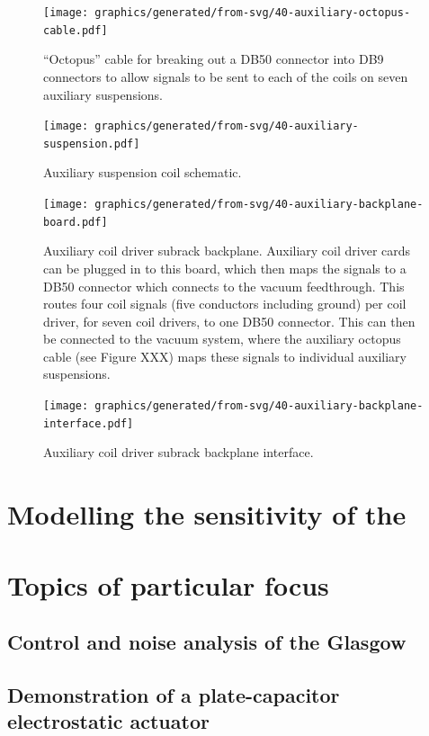 \begin{figure}
  \centering
  \texttt{[image: graphics/generated/from-svg/40-auxiliary-octopus-cable.pdf]}
  \caption[Auxiliary octopus cable schematic]{\label{fig:aux-octopus-cable-wiring}``Octopus'' cable for breaking out a DB50 connector into DB9 connectors to allow signals to be sent to each of the coils on seven auxiliary suspensions.}
\end{figure}

\begin{figure}
  \centering
  \texttt{[image: graphics/generated/from-svg/40-auxiliary-suspension.pdf]}
  \caption[Auxiliary suspension coil schematic]{\label{fig:aux-suspension-wiring}Auxiliary suspension coil schematic.}
\end{figure}

\begin{figure}
  \centering
  \texttt{[image: graphics/generated/from-svg/40-auxiliary-backplane-board.pdf]}
  \caption[Auxiliary subrack backplane board schematic]{\label{fig:aux-backplane-schematic}Auxiliary coil driver subrack backplane. Auxiliary coil driver cards can be plugged in to this board, which then maps the signals to a DB50 connector which connects to the vacuum feedthrough. This routes four coil signals (five conductors including ground) per coil driver, for seven coil drivers, to one DB50 connector. This can then be connected to the vacuum system, where the auxiliary octopus cable (see Figure XXX) maps these signals to individual auxiliary suspensions.}
\end{figure}

\begin{figure}
  \centering
  \texttt{[image: graphics/generated/from-svg/40-auxiliary-backplane-interface.pdf]}
  \caption[Auxiliary subrack backplane interface]{\label{fig:aux-backplane-interface}Auxiliary coil driver subrack backplane interface.}
\end{figure}

\section{Modelling the sensitivity of the \SSM{}}

\section{Topics of particular focus}

\subsection{Control and noise analysis of the Glasgow \SSM{}}

\subsection{Demonstration of a plate-capacitor electrostatic actuator}